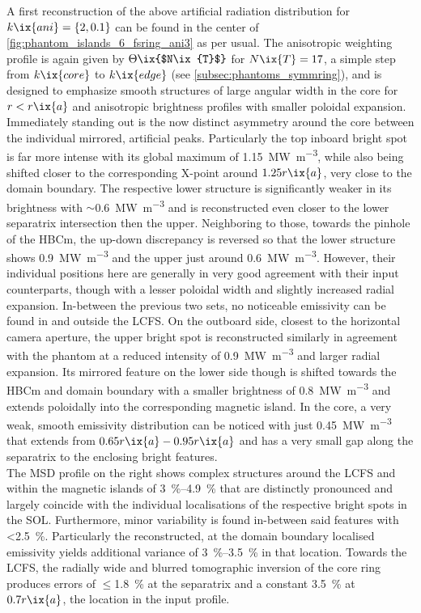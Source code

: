             A first reconstruction of the above artificial radiation distribution for $k\ix{ani}=\left\{2,0.1\right\}$ can be found in the center of \cref{fig:phantom_islands_6_fsring_ani3} as per usual. The anisotropic weighting profile is again given by $\Theta\ix{$N\ix{T}$}$ for $N\ix{T}=17$, a simple step from $k\ix{core}$ to $k\ix{edge}$ (see \cref{subsec:phantoms_symmring}), and is designed to emphasize smooth structures of large angular width in the core for $r<r\ix{a}$ and anisotropic brightness profiles with smaller poloidal expansion. Immediately standing out is the now distinct asymmetry around the core between the individual mirrored, artificial peaks. Particularly the top inboard bright spot is far more intense with its global maximum of \SI{1.15}{\mega\watt\per\cubic\meter}, while also being shifted closer to the corresponding X-point around $1.25r\ix{a}$, very close to the domain boundary. The respective lower structure is significantly weaker in its brightness with $\sim$\SI{0.6}{\mega\watt\per\cubic\meter} and is reconstructed even closer to the lower separatrix intersection then the upper. Neighboring to those, towards the pinhole of the HBCm, the up-down discrepancy is reversed so that the lower structure shows \SI{0.9}{\mega\watt\per\cubic\meter} and the upper just around \SI{0.6}{\mega\watt\per\cubic\meter}. However, their individual positions here are generally in very good agreement with their input counterparts, though with a lesser poloidal width and slightly increased radial expansion. In-between the previous two sets, no noticeable emissivity can be found in and outside the LCFS. On the outboard side, closest to the horizontal camera aperture, the upper bright spot is reconstructed similarly in agreement with the phantom at a reduced intensity of \SI{0.9}{\mega\watt\per\cubic\meter} and larger radial expansion. Its mirrored feature on the lower side though is shifted towards the HBCm and domain boundary with a smaller brightness of \SI{0.8}{\mega\watt\per\cubic\meter} and extends poloidally into the corresponding magnetic island. In the core, a very weak, smooth emissivity distribution can be noticed with just \SI{0.45}{\mega\watt\per\cubic\meter} that extends from $0.65r\ix{a}-0.95r\ix{a}$ and has a very small gap along the separatrix to the enclosing bright features.\\%
            The MSD profile on the right shows complex structures around the LCFS and within the magnetic islands of \SIrange{3}{4.9}{\percent} that are distinctly pronounced and largely coincide with the individual localisations of the respective bright spots in the SOL. Furthermore, minor variability is found in-between said features with <\SI{2.5}{\percent}. Particularly the reconstructed, at the domain boundary localised emissivity yields additional variance of \SIrange{3}{3.5}{\percent} in that location. Towards the LCFS, the radially wide and blurred tomographic inversion of the core ring produces errors of $\le$\SI{1.8}{\percent} at the separatrix and a constant \SI{3.5}{\percent} at $0.7r\ix{a}$, the location in the input profile.\\%
